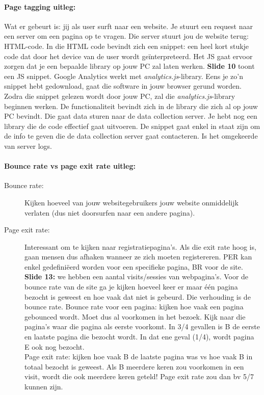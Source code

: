 \documentclass[10pt,a4paper]{report}
\begin{document}
\paragraph{Page tagging uitleg:}Wat er gebeurt is: jij als user surft naar een website. Je stuurt een request naar een server om een pagina op te vragen. Die server stuurt jou de website terug: HTML-code. In die HTML code bevindt zich een snippet: een heel kort stukje code dat door het device van de user wordt geïnterpreteerd. Het JS gaat ervoor zorgen dat je een bepaalde library op jouw PC zal laten werken. \textbf{Slide 10} toont een JS snippet. Google Analytics werkt met \emph{analytics.js}-library. Eens je zo'n snippet hebt gedownload, gaat die software in jouw browser gerund worden. Zodra die snippet gelezen wordt door jouw PC, zal die \emph{analytics.js}-library beginnen werken. De functionaliteit bevindt zich in de library die zich al op jouw PC bevindt. Die gaat data sturen naar de data collection server.
Je hebt nog een library die de code effectief gaat uitvoeren. De snippet gaat enkel in staat zijn om de info te geven die de data collection server gaat contacteren.
Is het omgekeerde van server logs.

\paragraph{Bounce rate vs page exit rate uitleg:}
\begin{description}
\item[Bounce rate:]Kijken hoeveel van jouw websitegebruikers jouw website onmiddelijk verlaten (dus niet doorsurfen naar een andere pagina).
\item[Page exit rate:]Interessant om te kijken naar registratiepagina's. Als die exit rate hoog is, gaan mensen dus afhaken wanneer ze zich moeten registereren.
PER kan enkel gedefiniëerd worden voor een specifieke pagina, BR voor de site.\\
\textbf{Slide 13:} we hebben een aantal visits/sessies van webpagina's. Voor de bounce rate van de site ga je kijken hoeveel keer er maar \'e\'en pagina bezocht is geweest en hoe vaak dat niet is gebeurd. Die verhouding is de bounce rate.
Bounce rate voor een pagina: kijken hoe vaak een pagina gebounced wordt. Moet dus al voorkomen in het bezoek. Kijk naar die pagina's waar die pagina als eerste voorkomt. In 3/4 gevallen is B de eerste en laatste pagina die bezocht wordt. In dat ene geval (1/4), wordt pagina E ook nog bezocht.\\
Page exit rate: kijken hoe vaak B de laatste pagina was vs hoe vaak B in totaal bezocht is geweest. Als B meerdere keren zou voorkomen in een visit, wordt die ook meerdere keren geteld! Page exit rate zou dan bv 5/7 kunnen zijn.
\end{description}
\end{document}

